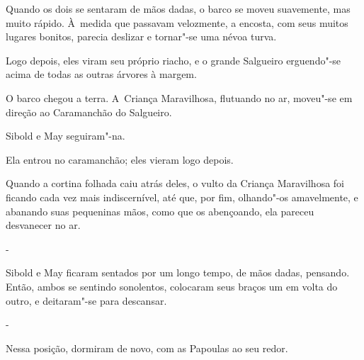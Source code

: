 Quando os dois se sentaram de mãos dadas, o barco se moveu suavemente,
mas muito rápido. À~medida que passavam velozmente, a encosta, com seus
muitos lugares bonitos, parecia deslizar e tornar"-se uma névoa turva.

Logo depois, eles viram seu próprio riacho, e o grande Salgueiro
erguendo"-se acima de todas as outras árvores à margem.

O barco chegou a terra. A~Criança Maravilhosa, flutuando no ar, moveu"-se
em direção ao Caramanchão do Salgueiro.

Sibold e May seguiram"-na.

Ela entrou no caramanchão; eles vieram logo depois.

Quando a cortina folhada caiu atrás deles, o vulto da Criança
Maravilhosa foi ficando cada vez mais indiscernível, até que, por fim,
olhando"-os amavelmente, e abanando suas pequeninas mãos, como que os
abençoando, ela pareceu desvanecer no ar.

-

Sibold e May ficaram sentados por um longo tempo, de mãos dadas,
pensando. Então, ambos se sentindo sonolentos, colocaram seus braços um
em volta do outro, e deitaram"-se para descansar.

-

Nessa posição, dormiram de novo, com as Papoulas ao seu redor.

